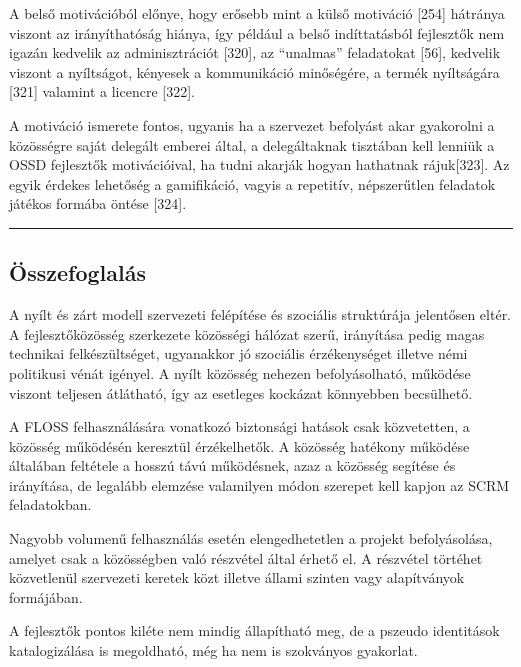 \documentclass[12pt,magyar,a4paper,oneside]{scrreprt}
\begin{document}
A belső motivációból előnye, hogy erősebb mint a külső motiváció
{[}254{]} hátránya viszont az irányíthatóság hiánya, így például a belső
indíttatásból fejlesztők nem igazán kedvelik az adminisztrációt
{[}320{]}, az ``unalmas'' feladatokat {[}56{]}, kedvelik viszont a
nyíltságot, kényesek a kommunikáció minőségére, a termék nyíltságára
{[}321{]} valamint a licencre {[}322{]}.

A motiváció ismerete fontos, ugyanis ha a szervezet befolyást akar
gyakorolni a közösségre saját delegált emberei által, a delegáltaknak
tisztában kell lenniük a OSSD fejlesztők motivációival, ha tudni akarják
hogyan hathatnak rájuk{[}323{]}. Az egyik érdekes lehetőség a
gamifikáció, vagyis a repetitív, népszerűtlen feladatok játékos formába
öntése {[}324{]}.

\begin{center}\rule{0.5\linewidth}{\linethickness}\end{center}

\hypertarget{uxf6sszefoglaluxe1s-4}{%
\subsection{Összefoglalás}\label{uxf6sszefoglaluxe1s-4}}

A nyílt és zárt modell szervezeti felépítése és szociális struktúrája
jelentősen eltér. A fejlesztőközösség szerkezete közösségi hálózat
szerű, irányítása pedig magas technikai felkészültséget, ugyanakkor jó
szociális érzékenységet illetve némi politikusi vénát igényel. A nyílt
közösség nehezen befolyásolható, működése viszont teljesen átlátható,
így az esetleges kockázat könnyebben becsülhető.

A FLOSS felhasználására vonatkozó biztonsági hatások csak közvetetten, a
közösség működésén keresztül érzékelhetők. A közösség hatékony működése
általában feltétele a hosszú távú működésnek, azaz a közösség segítése
és irányítása, de legalább elemzése valamilyen módon szerepet kell
kapjon az SCRM feladatokban.

Nagyobb volumenű felhasználás esetén elengedhetetlen a projekt
befolyásolása, amelyet csak a közösségben való részvétel által érhető
el. A részvétel törtéhet közvetlenül szervezeti keretek közt illetve
állami szinten vagy alapítványok formájában.

A fejlesztők pontos kiléte nem mindig állapítható meg, de a pszeudo
identitások katalogizálása is megoldható, még ha nem is szokványos
gyakorlat.
\end{document}
